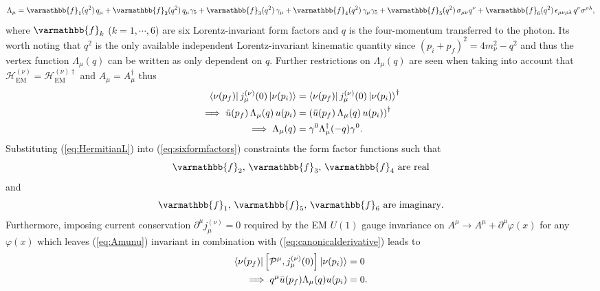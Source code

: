 %
\begin{equation}\label{eq:sixformfactors}
\Lambda_\mu = \varmathbb{f}_1(q^2)\,q_\mu
      + \varmathbb{f}_2(q^2)\,q_\mu\gamma_5
      + \varmathbb{f}_3(q^2)\,\gamma_\mu
      + \varmathbb{f}_4(q^2)\,\gamma_\mu\gamma_5
      + \varmathbb{f}_5(q^2)\,\sigma_{\mu\nu}q^{\nu}
      + \varmathbb{f}_6(q^2)\,\epsilon_{\mu\nu\rho\lambda}\,q^{\nu}\sigma^{\rho\lambda},
\end{equation}
where $\varmathbb{f}_{k}$ ($k=1,\cdots,6$) are six Lorentz-invariant form factors and $q$ is the four-momentum transferred to the photon. Its worth noting that $q^2$ is the only available independent Lorentz-invariant kinematic quantity since $(p_i + p_f)^2 = 4m_{\nu}^2 - q^2$ and thus the vertex function $\Lambda_\mu(q)$ can be written as only dependent on $q$. Further restrictions on $\Lambda_\mu(q)$ are seen when taking into account that $\mathcal{H}^{(\nu)}_{\text{EM}} = \mathcal{H}^{(\nu)\dagger}_{\text{EM}}$ and $A_\mu = A_\mu^\dagger$ thus
\begin{align}
	\bra{\nu(p_f)}j^{(\nu)}_{\mu}(0)\ket{\nu(p_i)} &= \bra{\nu(p_f)}j^{(\nu)}_{\mu}(0)\ket{\nu(p_i)}^\dagger\\
	\implies \bar{u}(p_f)\,\Lambda_\mu(q)\,u(p_i) &= \left(\bar{u}(p_f)\,\Lambda_\mu(q)\,u(p_i)\right)^\dagger\\\label{eq:HermitianL}
	\implies \Lambda_\mu(q) &= \gamma^0 \Lambda_\mu^\dagger(-q) \gamma^0.
\end{align}
Substituting (\ref{eq:HermitianL}) into (\ref{eq:sixformfactors}) constraints the form factor functions such that
\begin{equation}\label{eq:arereal}
	\varmathbb{f}_2,\,\varmathbb{f}_3,\,\varmathbb{f}_4~\text{are real}
\end{equation}
and 
\begin{equation}\label{eq:areimag}
	\varmathbb{f}_1,\,\varmathbb{f}_5,\,\varmathbb{f}_6~\text{are imaginary}.
\end{equation}
Furthermore, imposing current conservation $\partial^{\mu}j^{(\nu)}_\mu=0$ required by the EM $U(1)$ gauge invariance on $A^\mu \rightarrow A^\mu + \partial^\mu \varphi(x)$ for any $\varphi(x)$ which leaves (\ref{eq:Amunu}) invariant in combination with (\ref{eq:canonicalderivative}) leads to
\begin{align}
	\bra{\nu(p_f)}\left[ \mathcal{P}^\mu, j^{(\nu)}_\mu(0)\right]\ket{\nu(p_i)} &= 0\\\label{eq:equalzero}
	\implies q^\mu \bar{u}(p_f) \Lambda_\mu (q) u(p_i) &= 0.
\end{align}
